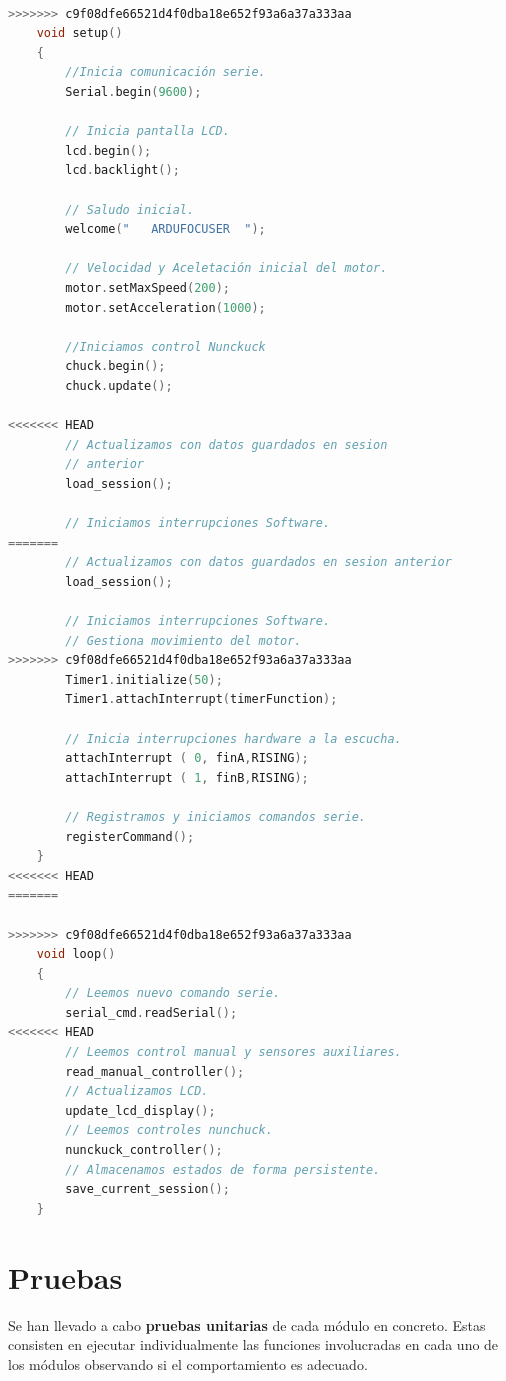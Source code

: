 \begin{lstlisting}[language=C, caption={Núcleo implementación firmware  ardufocuser},label={lst:nucleo_firmware_ardufocuser }]

>>>>>>> c9f08dfe66521d4f0dba18e652f93a6a37a333aa
	void setup()
	{
		//Inicia comunicación serie.
		Serial.begin(9600);
		
		// Inicia pantalla LCD.
		lcd.begin();
		lcd.backlight();
		
		// Saludo inicial.
		welcome("   ARDUFOCUSER  ");
		
		// Velocidad y Aceletación inicial del motor.
		motor.setMaxSpeed(200);
		motor.setAcceleration(1000);
		
		//Iniciamos control Nunckuck
		chuck.begin();
		chuck.update();
		
<<<<<<< HEAD
		// Actualizamos con datos guardados en sesion 
		// anterior
		load_session();
		
		// Iniciamos interrupciones Software.
=======
		// Actualizamos con datos guardados en sesion anterior
		load_session();
		
		// Iniciamos interrupciones Software.
		// Gestiona movimiento del motor.
>>>>>>> c9f08dfe66521d4f0dba18e652f93a6a37a333aa
		Timer1.initialize(50);
		Timer1.attachInterrupt(timerFunction);
		
		// Inicia interrupciones hardware a la escucha.
		attachInterrupt ( 0, finA,RISING);
		attachInterrupt ( 1, finB,RISING);
		
		// Registramos y iniciamos comandos serie.
		registerCommand();
	}
<<<<<<< HEAD
=======
	
>>>>>>> c9f08dfe66521d4f0dba18e652f93a6a37a333aa
	void loop()
	{
		// Leemos nuevo comando serie.
		serial_cmd.readSerial();
<<<<<<< HEAD
		// Leemos control manual y sensores auxiliares.
		read_manual_controller();
		// Actualizamos LCD.
		update_lcd_display();
		// Leemos controles nunchuck.
		nunckuck_controller();
		// Almacenamos estados de forma persistente.
		save_current_session();
	}
\end{lstlisting}


\section{Pruebas}


Se han llevado a cabo \textbf{pruebas unitarias} de cada módulo en concreto. Estas consisten en ejecutar individualmente las funciones involucradas en cada uno de los módulos observando si el comportamiento es adecuado. 

